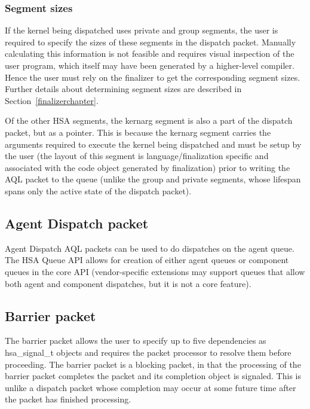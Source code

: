 \documentclass[final]{book}
\newcommand{\reftyp}[1]{#1}
\begin{document}
\hypertarget{segment-sizes}{}\subsubsection{Segment sizes}
\label{segment-sizes}

If the kernel being dispatched uses private and group segments, the user is
required to specify the sizes of these segments in the dispatch
packet. Manually calculating this information is not feasible and requires
visual inspection of the user program, which itself may have been generated by a
higher-level compiler. Hence the user must rely on the finalizer to get the
corresponding segment sizes. Further details about determining segment sizes are
described in Section~\ref{finalizerchapter}.

Of the other HSA segments, the kernarg segment is also a part of the dispatch
packet, but as a pointer. This is because the kernarg segment carries the
arguments required to execute the kernel being dispatched and must be setup by
the user (the layout of this segment is language/finalization specific and
associated with the code object generated by finalization) prior to writing the
AQL packet to the queue (unlike the group and private segments, whose lifespan
spans only the active state of the dispatch packet). 
\hypertarget{agent-packet}{}\subsection{Agent Dispatch packet}
\label{agent-packet}

Agent Dispatch AQL packets can be used to do dispatches on the agent queue. The
HSA Queue API allows for creation of either agent queues or component queues in
the core API (vendor-specific extensions may support queues that allow both
agent and component dispatches, but it is not a core feature).

\hypertarget{barrier-packet}{}\subsection{Barrier packet}
\label{barrier-packet}

The barrier packet allows the user to specify up to five dependencies as
\reftyp{hsa_signal_t} objects and requires the packet processor to resolve them
before proceeding. The barrier packet is a blocking packet, in that the
processing of the barrier packet completes the packet and its completion object
is signaled. This is unlike a dispatch packet whose completion may occur at some
future time after the packet has finished processing.
\end{document}
